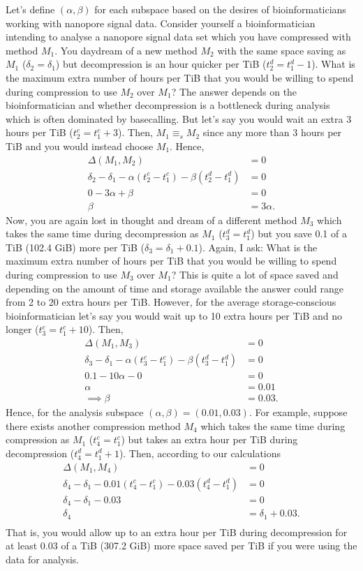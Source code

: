 Let's define $(\alpha,\beta)$ for each subspace based on the desires of
bioinformaticians working with nanopore signal data. Consider yourself a
bioinformatician intending to analyse a nanopore signal data set which you have
compressed with method $M_1$. You daydream of a new method $M_2$ with the same
space saving as $M_1$ ($\delta_2=\delta_1$) but decompression is an hour quicker
per TiB ($t^d_2=t^d_1-1$). What is the maximum extra number of hours per TiB
that you would be willing to spend during compression to use $M_2$ over $M_1$?
The answer depends on the bioinformatician and whether decompression is a
bottleneck during analysis which is often dominated by basecalling. But let's
say you would wait an extra 3 hours per TiB ($t^c_2=t^c_1+3$). Then,
$M_1\equiv_sM_2$ since any more than 3 hours per TiB and you would instead
choose $M_1$. Hence,
\begin{align*}
	\Delta(M_1,M_2)&=0\\
	\delta_2-\delta_1-\alpha(t^c_2-t^c_1) - \beta(t^d_2-t^d_1) &= 0\\
	0-3\alpha + \beta &= 0\\
	\beta &= 3\alpha.
\end{align*}
Now, you are again lost in thought and dream of a different method $M_3$ which
takes the same time during decompression as $M_1$ ($t^d_3=t^d_1$) but you save
0.1 of a TiB (102.4 GiB) more per TiB ($\delta_3=\delta_1+0.1$). Again, I ask:
What is the maximum extra number of hours per TiB that you would be willing to
spend during compression to use $M_3$ over $M_1$? This is quite a lot of space
saved and depending on the amount of time and storage available the answer could
range from 2 to 20 extra hours per TiB. However, for the average
storage-conscious bioinformatician let's say you would wait up to 10 extra hours
per TiB and no longer ($t^c_3=t^c_1+10$). Then,
\begin{align*}
	\Delta(M_1,M_3)&=0\\
	\delta_3-\delta_1 - \alpha(t^c_3-t^c_1) - \beta(t^d_3-t^d_1) &= 0\\
	0.1 - 10\alpha - 0 &=0\\
	\alpha&=0.01\\
	\implies \beta&=0.03.
\end{align*}
Hence, for the analysis subspace $(\alpha,\beta)=(0.01,0.03)$. For example,
suppose there exists another compression method $M_4$ which takes the same time
during compression as $M_1$ ($t_4^c=t_1^c$) but takes an extra hour per TiB
during decompression ($t_4^d=t_1^d+1$). Then, according to our calculations
\begin{align*}
	\Delta(M_1,M_4)&=0\\
	\delta_4-\delta_1 - 0.01(t^c_4-t^c_1) - 0.03(t^d_4-t^d_1) &= 0\\
	\delta_4-\delta_1 - 0.03 &= 0\\
	\delta_4&=\delta_1 + 0.03.\\
\end{align*}
That is, you would allow up to an extra hour per TiB during decompression for at
least 0.03 of a TiB (307.2 GiB) more space saved per TiB if you were using the
data for analysis.

